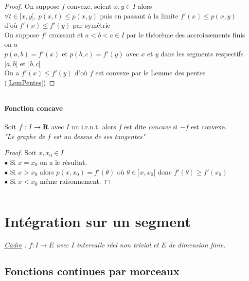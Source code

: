     \begin{proof}
    \fbox{$\Rightarrow$} On suppose $f$ convexe, soient $x,y \in I$ alors \\
    $\forall t\in ]x,y[ ,~p(x,t)\leq p(x,y)$ puis en passant à la limite $f'(x) \leq p(x,y)$ d'où $f'(x)\leq f'(y)$ par symétrie \\
    \fbox{$\Leftarrow$} On suppose $f'$ croissant et $a<b<c \in I$ par le théorème des accroissements finis on a\\
    $p(a,b) = f'(x)$ et $p(b,c) = f'(y)$ avec $x$ et $y$ dans les segments respectifs $]a,b[$ et $]b,c[$\\
    On a $f'(x) \leq f'(y)$ d'où $f$ est convexe par le Lemme des pentes (\ref{LemPentes})
    \end{proof}
    ${}$ \\  \traitd
    \paragraph{Fonction concave}
        Soit $f:I\rightarrow {\mathbf{R}}$ avec $I$ un i.r.n.t. alors $f$ est dite \emph{concave} si $-f$ est convexe. \trait
    \\ \textit{"Le graphe de $f$ est au dessus de ses tangentes"}
    \begin{proof}
    Soit $x,x_0 \in I$ \\$\bullet$ Si $x=x_0$ on a le résultat.\\ $\bullet$ Si $x>x_0$ alors $p(x,x_0) = f'(\theta )$ où 
    $\theta \in ]x,x_0[$ donc $f'(\theta ) \geqslant f'(x_0)$ \\ $\bullet$ Si $x<x_0$ même raisonnement.
    \end{proof} ${}$
\section{Intégration sur un segment}
    \textit{\underline{Cadre} : $f:I\rightarrow E$ avec $I$ intervalle réel non trivial et $E$ de dimension \emph{finie}.}
\subsection{Fonctions continues par morceaux}
    \traitd
